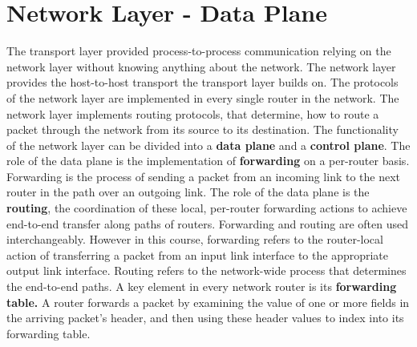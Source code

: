 \section{Network Layer - Data Plane}
The transport layer provided process-to-process communication relying on the network layer without knowing anything about the network. The network layer provides the host-to-host transport the transport layer builds on. The protocols of the network layer are implemented in every single router in the network. The network layer implements routing protocols, that determine, how to route a packet through the network from its source to its destination. The functionality of the network layer can be divided into a \textbf{data plane} and a \textbf{control plane}. The role of the data plane is the implementation of \textbf{forwarding} on a per-router basis. Forwarding is the process of sending a packet from an incoming link to the next router in the path over an outgoing link. The role of the data plane is the \textbf{routing}, the coordination of these local, per-router forwarding actions to achieve end-to-end transfer along paths of routers. Forwarding and routing are often used interchangeably. However in this course, forwarding refers to the router-local action of transferring a packet from an input link interface to the appropriate output link interface. Routing refers to the network-wide process that determines the end-to-end paths. A key element in every network router is its \textbf{forwarding table.} A router forwards a packet by examining the value of one or more fields in the arriving packet's header, and then using these header values to index into its forwarding table.

